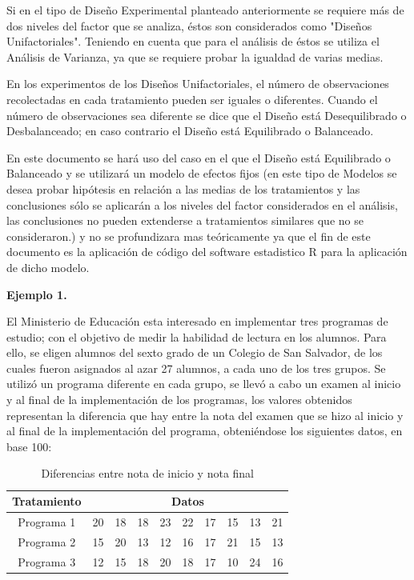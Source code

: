\documentclass[12pt,letterpaper]{report}
\begin{document}
Si en el tipo de Diseño Experimental planteado anteriormente se requiere más de dos
niveles del factor que se analiza, éstos son considerados como "Diseños Unifactoriales".
Teniendo en cuenta que para el análisis de éstos se utiliza el Análisis de Varianza, ya que se
requiere probar la igualdad de varias medias.

En los experimentos de los Diseños Unifactoriales, el número de observaciones
recolectadas en cada tratamiento pueden ser iguales o diferentes. Cuando el número de
observaciones sea diferente se dice que el Diseño está Desequilibrado o Desbalanceado; en
caso contrario el Diseño está Equilibrado o Balanceado.

En este documento se hará uso del caso en el que el Diseño está Equilibrado o Balanceado y se utilizará un modelo de efectos fijos (en este tipo
de Modelos se desea probar hipótesis en relación a las medias de los tratamientos y las
conclusiones sólo se aplicarán a los niveles del factor considerados en el análisis, las
conclusiones no pueden extenderse a tratamientos similares que no se consideraron.) y no se profundizara mas teóricamente ya que el fin de este documento es la aplicación de código del software estadistico R para la aplicación de dicho modelo.

\textbf{Ejemplo 1.}

El Ministerio de Educación esta interesado en implementar tres programas de estudio; con el
objetivo de medir la habilidad de lectura en los alumnos. Para ello, se eligen alumnos del sexto
grado de un Colegio de San Salvador, de los cuales fueron asignados al azar 27 alumnos, a
cada uno de los tres grupos. Se utilizó un programa diferente en cada grupo, se llevó a cabo un
examen al inicio y al final de la implementación de los programas, los valores obtenidos
representan la diferencia que hay entre la nota del examen que se hizo al inicio y al final de la
implementación del programa, obteniéndose los siguientes datos, en base 100:
\begin{table}[htb]
\centering
\begin{tabular}{||c|c|c|c|c|c|c|c|c|c||}
\hline
\hline
Tratamiento  & \multicolumn{9}{c||}{Datos} \\
\hline
Programa 1 &20&18&18&23&22&17&15&13&21 \\
\hline
Programa 2 &15&20&13&12&16&17&21&15&13 \\
\hline
Programa 3 &12&15&18&20&18&17&10&24&16 \\
\hline
\hline

\end{tabular}
\caption{Diferencias entre nota de inicio y nota final}
\end{table}
\end{document}
